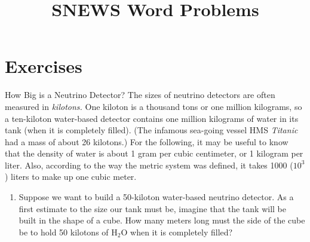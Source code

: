 \documentclass[12pt]{article}
\begin{document}
\title{SNEWS Word Problems}
\author{}
\date{}
\maketitle

\section{Exercises}

\begin{probdesc}{1}{How Big is a Neutrino Detector?}
The sizes of neutrino detectors are often measured in {\em kilotons.}
One kiloton is a thousand tons or one million kilograms, so a
ten-kiloton water-based detector contains one million kilograms of
water in its tank (when it is completely filled).  (The infamous
sea-going vessel HMS {\em Titanic} had a mass of about 26 kilotons.)
For the following, it may be useful to know that the density of water
is about 1 gram per cubic centimeter, or 1 kilogram per liter.  Also,
according to the way the metric system was defined, it takes 1000
($10^3$) liters to make up one cubic meter.

\begin{enumerate}
\item[(a)] Suppose we want to build a 50-kiloton water-based neutrino
  detector.  As a first estimate to the size our tank must be, imagine
  that the tank will be built in the shape of a cube.  How many meters
  long must the side of the cube be to hold 50 kilotons of H$_2$O when
  it is completely filled?

\end{enumerate}

\end{probdesc}
\end{document}
